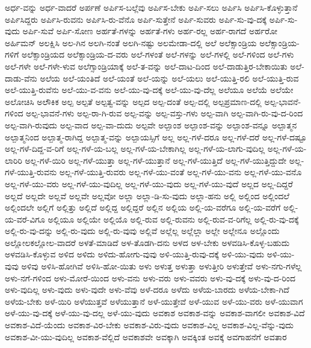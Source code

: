{ಅರ್ಧ-ವನ್ನು
ಅರ್ಧ-ವಾದರೆ
ಅರ್ಪಣೆ
ಅರ್ಪಿಸ-ಬಲ್ಲೆವು
ಅರ್ಪಿಸ-ಬೇಕು
ಅರ್ಪಿ-ಸಲು
ಅರ್ಪಿಸಿ
ಅರ್ಪಿಸಿ-ಕೊಳ್ಳುತ್ತಾನೆ
ಅರ್ಪಿಸಿದ್ದರು
ಅರ್ಪಿಸಿ-ರುವನು
ಅರ್ಪಿಸಿ-ರು-ವೆನೊ
ಅರ್ಪಿ-ಸುತ್ತೇನೆ
ಅರ್ಪಿ-ಸುವರು
ಅರ್ಪಿ-ಸು-ವು-ದಕ್ಕೆ
ಅರ್ಪಿ-ಸು-ವುದು
ಅರ್ಪಿ-ಸುವೆ
ಅರ್ಪಿ-ಸೋಣ
ಅರ್ಹತೆ-ಗಳನ್ನು
ಅರ್ಹತೆ-ಗಳು
ಅರ್ಹ-ರಲ್ಲ
ಅರ್ಹ-ರಾಗದೆ
ಅರ್ಹರೋ
ಅರ್ಹಿಮನ್
ಅಲಕ್ಷಿಸಿ
ಅಲ-ಗಿನ
ಅಲಗಿ-ನಂತೆ
ಅಲಗಿ-ನಷ್ಟು
ಅಲಮೇಡಾ-ದಲ್ಲಿ
ಅಲೆ
ಅಲೆಕ್ಸಾಂಡ್ರಿಯ
ಅಲೆಕ್ಸಾಂಡ್ರಿಯ-ಗಳಿಗೆ
ಅಲೆಕ್ಸಾಂಡ್ರಿಯದ
ಅಲೆಕ್ಸಾಂಡ್ರಿಯ-ದ-ವರು
ಅಲೆ-ಗಳಂತೆ
ಅಲೆ-ಗಳನ್ನು
ಅಲೆ-ಗಳಲ್ಲಿ
ಅಲೆ-ಗಳಿಂದ
ಅಲೆ-ಗಳು
ಅಲೆ-ಗಳೇ
ಅಲೆ-ಗಳೇ-ಳುವ
ಅಲೆಗ್ಸಾಂಡ್ರಿಯಾಕ್ಕೆ
ಅಲೆ-ತ-ವನ್ನು
ಅಲೆ-ದಾಟ-ದಿಂದ
ಅಲೆ-ದಾಡುತ್ತಿರ-ಬೇಕಾಯಿತು
ಅಲೆ-ದಾಡು-ವೆನು
ಅಲೆಯ
ಅಲೆ-ಯಂತಿದೆ
ಅಲೆ-ಯಂತೆ
ಅಲೆ-ಯನ್ನು
ಅಲೆ-ಯಲು
ಅಲೆ-ಯುತ್ತಿ-ರಲಿ
ಅಲೆ-ಯುತ್ತಿ-ರುವ
ಅಲೆ-ಯುತ್ತಿ-ರುವೆನು
ಅಲೆ-ಯು-ವ-ವನು
ಅಲೆ-ಯು-ವು-ದಕ್ಕೆ
ಅಲೆ-ಯು-ವು-ದೆಲ್ಲ
ಅಲೆಯೂ
ಅಲೆಯೆ
ಅಲೆಯೇ
ಅಲೋಚಿಸಿ
ಅಲೌಕಿಕ
ಅಲ್ಪ
ಅಲ್ಪತೆ
ಅಲ್ಪತ್ವ-ವನ್ನು
ಅಲ್ಪದ
ಅಲ್ಪ-ದಂತೆ
ಅಲ್ಪ-ದಲ್ಲಿ
ಅಲ್ಪಪ್ರಮಾಣ-ದಲ್ಲಿ
ಅಲ್ಪ-ಭಾವನೆ-ಗಳಿಂದ
ಅಲ್ಪ-ಭಾವನೆ-ಗಳು
ಅಲ್ಪ-ರಾ-ಗಿ-ರುವ
ಅಲ್ಪ-ವನ್ನು
ಅಲ್ಪ-ವಸ್ತು-ಗಳು
ಅಲ್ಪ-ವಾಗಿ
ಅಲ್ಪ-ವಾಗಿ-ರು-ವು-ದ-ರಿಂದ
ಅಲ್ಪ-ವಾಗಿ-ರುವುದು
ಅಲ್ಪ-ವಾದ
ಅಲ್ಪ-ವಾ-ದುದು
ಅಲ್ಪವೇ
ಅಲ್ಪಾಂಶ
ಅಲ್ಪಾಂಶ-ವನ್ನು
ಅಲ್ಪಾಂಶ-ವನ್ನೂ
ಅಲ್ಪಾತ್ಮನ
ಅಲ್ಪಾತ್ಮನಿಂದ
ಅಲ್ಪಾತ್ಮ-ರಾಗಿದ್ದ
ಅಲ್ಪಾತ್ಮ-ವನ್ನು
ಅಲ್ಪಾಯಸ್ಸಿಗೆ
ಅಲ್ಲ
ಅಲ್ಲ-ಗಳೆ-ದರೂ
ಅಲ್ಲ-ಗಳೆ-ದರೆ
ಅಲ್ಲ-ಗಳೆ-ದಷ್ಟೂ
ಅಲ್ಲ-ಗಳೆ-ದಿದ್ದ-ವ-ರಿಗೆ
ಅಲ್ಲ-ಗಳೆ-ಯ-ಬಲ್ಲ
ಅಲ್ಲ-ಗಳೆ-ಯ-ಬೇಕಾಗಿಲ್ಲ
ಅಲ್ಲ-ಗಳೆ-ಯ-ಲಾಗು-ವುದಿಲ್ಲ
ಅಲ್ಲ-ಗಳೆ-ಯ-ಲಾರಿರಿ
ಅಲ್ಲ-ಗಳೆ-ಯಿರಿ
ಅಲ್ಲ-ಗಳೆ-ಯುತ್ತಾ
ಅಲ್ಲ-ಗಳೆ-ಯುತ್ತಾನೆ
ಅಲ್ಲ-ಗಳೆ-ಯುತ್ತಿದೆ
ಅಲ್ಲ-ಗಳೆ-ಯುತ್ತಿದ್ದುದೇ
ಅಲ್ಲ-ಗಳೆ-ಯುತ್ತಿ-ರುವನು
ಅಲ್ಲ-ಗಳೆ-ಯುತ್ತಿ-ರುವರು
ಅಲ್ಲ-ಗಳೆ-ಯು-ವಂತೆ
ಅಲ್ಲ-ಗಳೆ-ಯು-ವನು
ಅಲ್ಲ-ಗಳೆ-ಯು-ವನೊ
ಅಲ್ಲ-ಗಳೆ-ಯು-ವರು
ಅಲ್ಲ-ಗಳೆ-ಯು-ವುದಿಲ್ಲ
ಅಲ್ಲ-ಗಳೆ-ಯು-ವುದು
ಅಲ್ಲ-ಗಳೆ-ಯು-ವುದೆ
ಅಲ್ಲದ
ಅಲ್ಲ-ದಿದ್ದರೆ
ಅಲ್ಲದೆ
ಅಲ್ಲದೇ
ಅಲ್ಲವೆ
ಅಲ್ಲವೇ
ಅಲ್ಲವೋ
ಅಲ್ಲಾ
ಅಲ್ಲಾ-ಡಿ-ಸು-ವುದು
ಅಲ್ಲಾ-ಹನು
ಅಲ್ಲಿ
ಅಲ್ಲಿಂದ
ಅಲ್ಲಿಂದಲೆ
ಅಲ್ಲಿಂದಲೇ
ಅಲ್ಲಿಗೆ
ಅಲ್ಲಿತ್ತು
ಅಲ್ಲಿದೆ
ಅಲ್ಲಿದ್ದ
ಅಲ್ಲಿದ್ದರೆ
ಅಲ್ಲಿನ
ಅಲ್ಲಿಯ
ಅಲ್ಲಿ-ಯ-ವರೆಗೂ
ಅಲ್ಲಿ-ಯ-ವರೆಗೆ
ಅಲ್ಲಿ-ಯ-ವರೆ-ವಿಗೂ
ಅಲ್ಲಿಯೂ
ಅಲ್ಲಿಯೇ
ಅಲ್ಲಿಯೊ
ಅಲ್ಲಿ-ರುವ
ಅಲ್ಲಿ-ರುವನು
ಅಲ್ಲಿ-ರುವ-ವ-ರಿಗೆಲ್ಲ
ಅಲ್ಲಿ-ರು-ವು-ದಕ್ಕೆ
ಅಲ್ಲಿ-ರು-ವು-ದನ್ನು
ಅಲ್ಲಿ-ರು-ವುದು
ಅಲ್ಲಿ-ರು-ವುವು
ಅಲ್ಲಿವೆ
ಅಲ್ಲೆಲ್ಲ
ಅಲ್ಲೆಲ್ಲಾ
ಅಲ್ಲೇ
ಅಲ್ಲೇನೂ
ಅಲ್ಲೊಂದು
ಅಲ್ಲೋಲಕಲ್ಲೋಲ-ವಾದರೆ
ಅಳತೆ-ಮಾಡಿದೆ
ಅಳ-ತೊಡಗಿ-ದನು
ಅಳದ
ಅಳ-ಬೇಕು
ಅಳವಡಿಸಿ-ಕೊಳ್ಳ-ಬಹುದು
ಅಳವಡಿಸಿ-ಕೊಳ್ಳುವ
ಅಳಿದ
ಅಳಿದು
ಅಳಿದು-ಹೋಗು-ವುವು
ಅಳಿ-ಯುತ್ತಿ-ರುವು-ದಕ್ಕೆ
ಅಳಿ-ಯು-ವುದು
ಅಳಿ-ಯು-ವುವು
ಅಳಿವು
ಅಳಿಸಿ-ಹೋಗಿವೆ
ಅಳಿಸಿ-ಹೋ-ಯಿತು
ಅಳು
ಅಳುತ್ತ
ಅಳುತ್ತಾ
ಅಳುತ್ತೀರಿ
ಅಳುತ್ತೇವೆ
ಅಳು-ನಗು-ಗಳೆಲ್ಲ
ಅಳು-ನಗೆ-ಗಳಿಂದ
ಅಳು-ಮೋರೆ-ಯಿಂದ
ಅಳು-ವನು
ಅಳು-ವರು
ಅಳು-ವವರು
ಅಳು-ವು-ದಕ್ಕೆ
ಅಳು-ವು-ದ-ರಿಂದ
ಅಳು-ವುದಿಲ್ಲ
ಅಳು-ವುದು
ಅಳು-ವುದೇ
ಅಳು-ವೆವು
ಅಳೆ-ದರೂ
ಅಳೆದು
ಅಳೆಯ-ಬಾರದು
ಅಳೆಯ-ಬೇಕಾ-ಗಿದೆ
ಅಳೆಯ-ಬೇಕು
ಅಳೆ-ಯಿರಿ
ಅಳೆಯುತ್ತವೆ
ಅಳೆಯುತ್ತಾನೆ
ಅಳೆ-ಯುತ್ತೇವೆ
ಅಳೆ-ಯುವ
ಅಳೆ-ಯು-ವರು
ಅಳೆ-ಯುವಾಗ
ಅಳೆ-ಯು-ವು-ದಕ್ಕೆ
ಅಳೆ-ಯು-ವು-ದಲ್ಲ
ಅಳೆ-ಯು-ವುದು
ಅವಕಾಶ
ಅವಕಾಶ-ವನ್ನು
ಅವಕಾಶ-ವಾಗಲೀ
ಅವಕಾಶ-ವಿದೆ
ಅವಕಾಶ-ವಿದೆ-ಯೆಂದು
ಅವಕಾಶ-ವಿರ-ಬೇಕು
ಅವಕಾಶ-ವಿರು-ವುದು
ಅವಕಾಶ-ವಿಲ್ಲ
ಅವಕಾಶ-ವಿಲ್ಲ-ವೆನ್ನು-ವುದು
ಅವಕಾಶ-ವೀ-ಯು-ವುದಿಲ್ಲ
ಅವಕಾಶ-ವೆಲ್ಲಿದೆ
ಅವಕಾಶವೇ
ಅವಕ್ಕಾಗಿ
ಅವಕ್ಕಿಂತ
ಅವಕ್ಕೆ
ಅವಗಾಹನೆಗೆ
ಅವತಾರ
}

